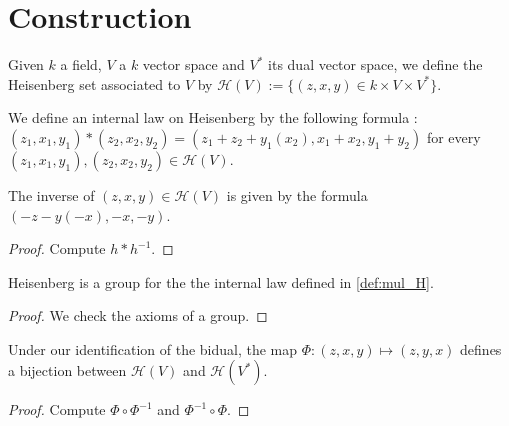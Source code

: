 \section{Construction}

\begin{definition}
    \label{def:heisenberg}
    \leanok

    Given $k$ a field, $V$ a $k$ vector space and $V^*$ its dual vector space,
    we define the Heisenberg set associated to $V$ by
    $\mathcal{H}(V):=\{(z,x,y) \in k\times V\times V^*\}$.
\end{definition}

\begin{definition}
    \label{def:mul_H}
    \leanok 

    We define an internal law on Heisenberg by the following formula :
    $(z_1,x_1,y_1)*(z_2,x_2,y_2) = (z_1+z_2+y_1(x_2),x_1+x_2,y_1+y_2)$ for every
     $(z_1,x_1,y_1),(z_2,x_2,y_2)\in\mathcal{H}(V)$.
\end{definition}

\begin{definition}
    \label{def:inv_H}
    \leanok 

    The inverse of $(z,x,y)\in\mathcal{H}(V)$ is given by the formula
    $(-z- y(-x), - x ,- y)$.
    \begin{proof}
        \leanok 
        Compute $h*h^{-1}$.
    \end{proof}
\end{definition}

\begin{proposition}
    \label{prop:group_H}
    \leanok
    Heisenberg is a group for the the internal law defined in \ref{def:mul_H}.
\end{proposition}
\begin{proof}
    \leanok
    We check the axioms of a group.
\end{proof}

\begin{definition}
    \label{def:bij_H}
    \leanok 

    Under our identification of the bidual, the map
    $\Phi : (z,x,y) \mapsto (z,y,x)$ defines a bijection 
    between $\mathcal{H}(V)$ and $\mathcal{H}(V^*)$.
    \begin{proof}
        \leanok
        Compute $\Phi\circ\Phi^{-1}$ and $\Phi^{-1}\circ\Phi$.
    \end{proof}
\end{definition}

